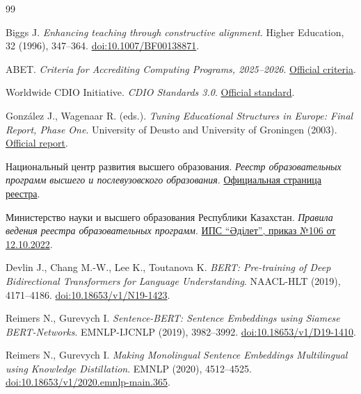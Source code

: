 \documentclass[twoside,11pt]{article}
\begin{document}
\fi

\begin{thebibliography}{99}

Biggs J.
\emph{Enhancing teaching through constructive alignment}.
Higher Education, 32 (1996), 347--364.
\href{https://doi.org/10.1007/BF00138871}{doi:10.1007/BF00138871}.

ABET.
\emph{Criteria for Accrediting Computing Programs, 2025--2026}.
\href{https://www.abet.org/accreditation/accreditation-criteria/criteria-for-accrediting-computing-programs-2025-2026/}{Official criteria}.

Worldwide CDIO Initiative.
\emph{CDIO Standards 3.0}.
\href{https://www.cdio.org/content/cdio-standards-30}{Official standard}.

Gonz\'alez J., Wagenaar R. (eds.).
\emph{Tuning Educational Structures in Europe: Final Report, Phase One}.
University of Deusto and University of Groningen (2003).
\href{https://tuningacademy.org/wp-content/uploads/2014/02/TuningEUI_Final-Report_EN.pdf}{Official report}.

Национальный центр развития высшего образования.
\emph{Реестр образовательных программ высшего и послевузовского образования}.
\href{https://www.enic-kazakhstan.edu.kz/ru/reestr-op/reestr-op-1}{Официальная страница реестра}.

Министерство науки и высшего образования Республики Казахстан.
\emph{Правила ведения реестра образовательных программ}.
\href{https://adilet.zan.kz/rus/docs/V2200030139}{ИПС ``Әділет'', приказ №106 от 12.10.2022}.

Devlin J., Chang M.-W., Lee K., Toutanova K.
\emph{BERT: Pre-training of Deep Bidirectional Transformers for Language Understanding}.
NAACL-HLT (2019), 4171--4186.
\href{https://doi.org/10.18653/v1/N19-1423}{doi:10.18653/v1/N19-1423}.

Reimers N., Gurevych I.
\emph{Sentence-BERT: Sentence Embeddings using Siamese BERT-Networks}.
EMNLP-IJCNLP (2019), 3982--3992.
\href{https://doi.org/10.18653/v1/D19-1410}{doi:10.18653/v1/D19-1410}.

Reimers N., Gurevych I.
\emph{Making Monolingual Sentence Embeddings Multilingual using Knowledge Distillation}.
EMNLP (2020), 4512--4525.
\href{https://doi.org/10.18653/v1/2020.emnlp-main.365}{doi:10.18653/v1/2020.emnlp-main.365}.


\end{thebibliography}
\end{document}
